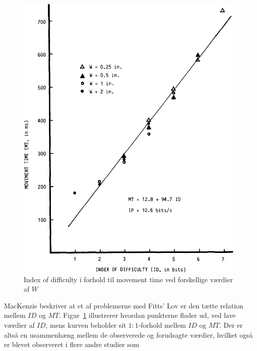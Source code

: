 \begin{figure}[h]
\centering
\includegraphics[scale=0.5]{billeder/mackenzie_fig3.png}
\caption{Index of difficulty i forhold til movement time ved forskellige værdier af $W$}
\label{fig:MacKenzie3}
\end{figure}
MacKenzie beskriver at et af problemerne med Fitts' Lov er den tætte relation mellem $ID$ og $MT$. Figur~\ref{fig:MacKenzie3} illustrerer hvordan punkterne flader ud, ved lave værdier af $ID$, mens kurven beholder sit $1:1$-forhold mellem $ID$ og $MT$. Der er altså en usammenhæng mellem de observerede og forudsagte værdier, hvilket også er blevet observeret i flere andre studier som \cite{welford1960, buck1986, crossman1983, drury1975, klapp1975, langolf1976, meyer1988, wallace1978}\\

